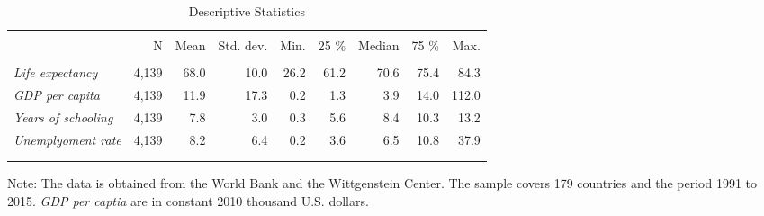 \documentclass[a4paper]{article}
\begin{document}
\begin{center}
\begin{table}[!htbp]
\caption{\label{tab:}\label{tab:descriptives_sample}Descriptive Statistics}
\begin{threeparttable}
\begin{tabular}[t]{lrrrrrrrr}
\\[-1.8ex]\hline \hline \\[-1.8ex]
  & N & Mean & Std. dev. & Min. & 25 \% & Median & 75 \% & Max.\\
\hline\\[-1.8ex]
\textit{Life expectancy} & 4,139 & 68.0 & 10.0 & 26.2 & 61.2 & 70.6 & 75.4 & 84.3\\
\textit{GDP per capita} & 4,139 & 11.9 & 17.3 & 0.2 & 1.3 & 3.9 & 14.0 & 112.0\\
\textit{Years of schooling} & 4,139 & 7.8 & 3.0 & 0.3 & 5.6 & 8.4 & 10.3 & 13.2\\
\textit{Unemplyoment rate} & 4,139 & 8.2 & 6.4 & 0.2 & 3.6 & 6.5 & 10.8 & 37.9\\
\\[-1.8ex]\hline \hline \\[-1.8ex]
\end{tabular}
\begin{tablenotes}[flushleft]
\setlength{\labelsep}{0pt}
\footnotetext
\item Note: The data is obtained from the World Bank and the Wittgenstein 
Center. The sample covers 179 countries and the period 1991 to 2015. 
\textit{GDP per captia} are in constant 2010 thousand U.S. dollars.
\end{tablenotes}
\end{threeparttable}
\end{table}
\end{center}
\end{document}

